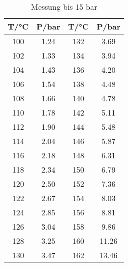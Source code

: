 \begin{table}
  \centering
  \caption{Messung bis 15 bar}
  \label{tab:data2}
\begin{tabular}{c c c c}
  \toprule
  T/\si{\celsius} &   P/\si{\bar}  &   T/\si{\celsius} &   P/\si{\bar} \\
  \midrule
  100  &   1.24   &   132  &   3.69  \\
  102  &   1.33   &   134  &   3.94  \\
  104  &   1.43   &   136  &   4.20  \\
  106  &   1.54   &   138  &   4.48  \\
  108  &   1.66   &   140  &   4.78  \\
  110  &   1.78   &   142  &   5.11  \\
  112  &   1.90   &   144  &   5.48  \\
  114  &   2.04   &   146  &   5.87  \\
  116  &   2.18   &   148  &   6.31  \\
  118  &   2.34   &   150  &   6.79  \\
  120  &   2.50   &   152  &   7.36  \\
  122  &   2.67   &   154  &   8.03  \\
  124  &   2.85   &   156  &   8.81  \\
  126  &   3.04   &   158  &   9.86  \\
  128  &   3.25   &   160  &  11.26  \\
  130  &   3.47   &   162  &  13.46  \\
  \bottomrule
  \end{tabular}
\end{table}
